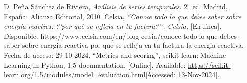 \begin{thebibliography}{99}
	 D. Pe\~na S\'anchez de Riviera, 
	{\it An\'alisis de series temporales}. $2^{\text{a}}$ ed. Madrid, Espa\~na:  Alianza Editorial, 2010.
	 Celsia, 
	{\it ``Conoce todo lo que debes saber sobre energ\'ia reactiva: ?`por qu\'e se refleja en tu factura?'', Celsia.} [En l\'inea]. Disponible: https://www.celsia.com/en/blog-celsia/conoce-todo-lo-que-debes-saber-sobre-energia-reactiva-por-que-se-refleja-en-tu-factura-la-energia-reactiva. Fecha de acceso: 29-10-2024.
	 ``Metrics and scoring'', scikit-learn: Machine Learning in Python, 1.5 documentation. [Online]. 
	Available: \url{https://scikit-learn.org/1.5/modules/model_evaluation.html}[Accessed: 13-Nov-2024]. 
\end{thebibliography}